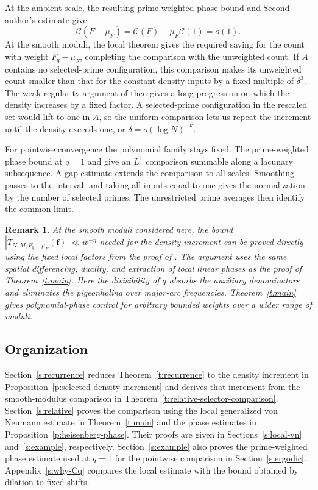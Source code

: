 \documentclass[12pt]{amsart}
\newcommand{\1}{\mathbf 1}
\newtheorem{remark}[theorem]{Remark}
\theoremstyle{definition}
\begin{document}
At the ambient scale, the resulting prime-weighted phase bound
and Second author's estimate give
$$\mathcal C(F-\mu_F)=\mathcal C(F)-\mu_F\mathcal C(1)=o(1).$$
At the smooth moduli, the local theorem gives the required
saving for the count with weight $F_q-\mu_F$, completing the
comparison with the unweighted count. If $A$ contains no
selected-prime configuration, this comparison makes its
unweighted count smaller than that for the constant-density
inputs by a fixed multiple of $\delta^3$. The weak regularity
argument of \cite{KMTT} then gives a long progression on which
the density increases by a fixed factor. A selected-prime
configuration in the rescaled set would lift to one in $A$,
so the uniform comparison lets us repeat the increment until
the density exceeds one, or $\delta=o(\log N)^{-\kappa}$.

For pointwise convergence the polynomial family stays fixed.
The prime-weighted phase bound at $q=1$ and \cite[Theorem~4.1]{Teravainen} give an $L^1$ comparison summable along a lacunary subsequence.
A gap estimate extends the comparison to all scales. Smoothing
passes to the interval, and taking all inputs equal to one
gives the normalization by the number of selected primes.
The unrestricted prime averages \cite{MirekWanWright} then identify the common limit.

\begin{remark}
At the smooth moduli considered here, the bound
$|T_{N,M,F_q-\mu_F}(\mathbf f)|\ll w^{-\eta}$ needed for the
density increment can be proved directly using the fixed local
factors from the proof of \cite[Lemma~5.3]{KMTT}. The argument
uses the same spatial differencing, duality, and extraction of
local linear phases as the proof of Theorem~\ref{t:main}.
Here the divisibility of $q$ absorbs the auxiliary denominators
and eliminates the pigeonholing over major-arc frequencies.
Theorem~\ref{t:main} gives polynomial-phase control for arbitrary
bounded weights over a wider range of moduli.
\end{remark}

\subsection{Organization}

Section~\ref{s:recurrence} reduces Theorem~\ref{t:recurrence}
to the density increment in Proposition~\ref{p:selected-density-increment}
and derives that increment from the smooth-modulus comparison
in Theorem~\ref{t:relative-selector-comparison}.
Section~\ref{s:relative} proves the comparison using the local
generalized von Neumann estimate in Theorem~\ref{t:main} and
the phase estimates in Proposition~\ref{p:heisenberg-phase}.
Their proofs are given in Sections~\ref{s:local-vn}
and~\ref{s:example}, respectively. Section~\ref{s:example}
also proves the prime-weighted phase estimate used at $q=1$
for the pointwise comparison in Section~\ref{s:ergodic}.
Appendix~\ref{s:why-Cq} compares the local estimate with the
bound obtained by dilation to fixed shifts.
\end{document}
